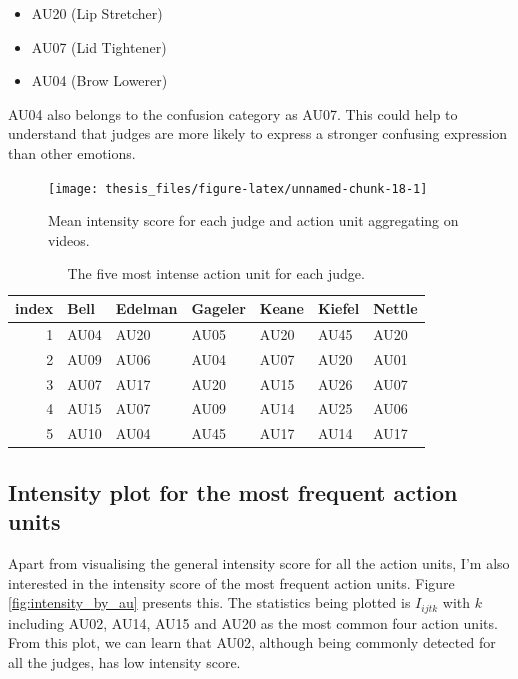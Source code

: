 \documentclass{monashthesis}
\begin{document}
\begin{itemize}
\tightlist
\item
  AU20 (Lip Stretcher)
\item
  AU07 (Lid Tightener)
\item
  AU04 (Brow Lowerer)
\end{itemize}

AU04 also belongs to the confusion category as AU07. This could help to understand that judges are more likely to express a stronger confusing expression than other emotions.

\begin{figure}
\texttt{[image: thesis\_files/figure-latex/unnamed-chunk-18-1]} \caption{Mean intensity score for each judge and action unit aggregating on videos.\label{fig:mean_intensity}}\label{fig:unnamed-chunk-18}
\end{figure}

\begin{table}[t]

\caption{\label{tab:unnamed-chunk-19}\label{tab:most_intense}The five most intense action unit for each judge.}
\centering
\begin{tabular}{r|l|l|l|l|l|l}
\hline
index & Bell & Edelman & Gageler & Keane & Kiefel & Nettle\\
\hline
1 & AU04 & AU20 & AU05 & AU20 & AU45 & AU20\\
\hline
2 & AU09 & AU06 & AU04 & AU07 & AU20 & AU01\\
\hline
3 & AU07 & AU17 & AU20 & AU15 & AU26 & AU07\\
\hline
4 & AU15 & AU07 & AU09 & AU14 & AU25 & AU06\\
\hline
5 & AU10 & AU04 & AU45 & AU17 & AU14 & AU17\\
\hline
\end{tabular}
\end{table}

\hypertarget{intensity-plot-for-the-most-frequent-action-units}{%
\subsection{Intensity plot for the most frequent action units}\label{intensity-plot-for-the-most-frequent-action-units}}

Apart from visualising the general intensity score for all the action units, I'm also interested in the intensity score of the most frequent action units. Figure \ref{fig:intensity_by_au} presents this. The statistics being plotted is \(I_{ijtk}\) with \(k\) including AU02, AU14, AU15 and AU20 as the most common four action units. From this plot, we can learn that AU02, although being commonly detected for all the judges, has low intensity score.
\end{document}
